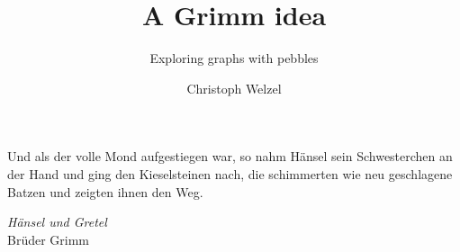 \documentclass{beamer}
\title{A Grimm idea}
\subtitle{Exploring graphs with pebbles}
\author{Christoph Welzel}
\institute{Logik und Theorie diskreter Systeme, RWTH Aachen}
\begin{document}
\maketitle
\begin{frame}
  \frametitle{}
  \epigraph{Und als der volle Mond aufgestiegen war, so nahm Hänsel sein %
    Schwesterchen an der Hand und ging den Kieselsteinen nach, die schimmerten %
  wie neu geschlagene Batzen und zeigten ihnen den Weg.}%
  {\emph{Hänsel und Gretel}\\Brüder Grimm}
\end{frame}
\end{document}
